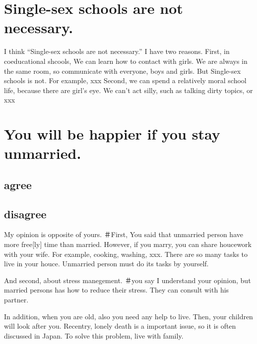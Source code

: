 \documentclass[11pt]{jsarticle}
\begin{document}
\section{Single-sex schools are not necessary.}
I think ``Single-sex schools are not necessary.'' I have two reasons.
First, in coeducational shcools, We can learn how to contact with girls.
We are always in the same room, so communicate with everyone, boys and girls.
But Single-sex schools is not. 
For example, xxx
Second, we can spend a relatively moral school life, because there are girl's eye.
We can't act silly, such as talking dirty topics, or xxx

\section{You will be happier if you stay unmarried.}
\subsection{agree}
\subsection{disagree}
My opinion is opposite of yours.
＃First, You said that unmarried person have more free[ly] time than married.
However, if you marry, you can share houcework with your wife.
For example, cooking, washing, xxx. 
There are so many tasks to live in your houce.
Unmarried person must do its tasks by yourself.

And second, about stress manegement.
＃you say 
I understand your opinion, but married persons has how to reduce their stress.
They can consult with his partner.

In addition, when you are old, also you need any help to live.
Then, your children will look after you.
Recentry, lonely death is a important issue, so it is often discussed in Japan.
To solve this problem, live with family. 
\end{document}
